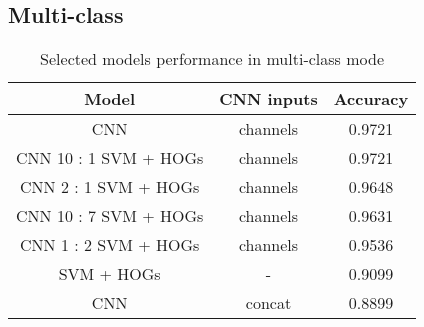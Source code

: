         \subsection{Multi-class}
        \begin{table}[H]
        \begin{center}
        \small
        \caption{Selected models performance in multi-class mode}
        \begin{tabular}{ |c|c|c| }
            \hline
            Model & CNN inputs & Accuracy\\
            \hline
            CNN & channels & 0.9721\\
            \hline
            CNN 10 : 1 SVM + HOGs & channels & 0.9721\\
            \hline
            CNN 2 : 1 SVM + HOGs & channels & 0.9648\\
            \hline
            CNN 10 : 7 SVM + HOGs & channels & 0.9631\\
            \hline
            CNN 1 : 2 SVM + HOGs & channels & 0.9536\\
            \hline
            SVM + HOGs & - & 0.9099\\
            \hline
            CNN & concat & 0.8899\\
            \hline
        \end{tabular}
        \end{center}
        \end{table}

